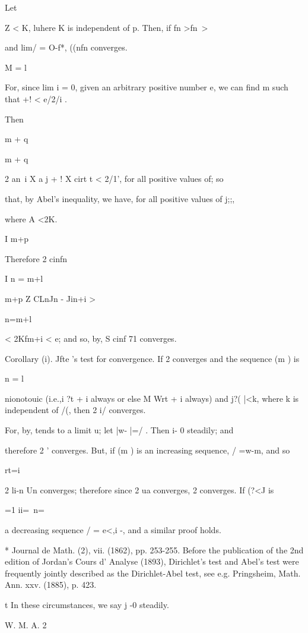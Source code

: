 Let

Z < K, luhere K is independent of p. Then, if fn >fn\-\ >

and lim/ = O-f*, ((nfn converges.

M = l

For, since lim i = 0, given an arbitrary positive number e, we can
find m such that +! < e/2/i .

Then

m + q

m + q

2 an\ i X a j + ! X cirt t < 2/1', for all positive values of; so

that, by Abel's inequality, we have, for all positive values of j;;,

where A <2K.

I m+p

Therefore 2 cinfn

I n = m+l

m+p Z CLnJn - Jin+i >

n=m+l

< 2Kfm+i < e; and so, by, S cinf 71 converges.

Corollary (i). Jfte 's test for convergence. If 2 converges and the
sequence (m ) is

n = l

nionotouic (i.e.,i ?t + i always or else M Wrt + i always) and j?(
|<k, where k is independent of /(, then 2 i/ converges.

For, by, tends to a limit u; let |w- |=/ . Then i- 0 steadily;
and

therefore 2 ' converges. But, if (m ) is an increasing sequence, /
=w-m, and so

rt=i

2 li-n Un converges; therefore since 2 ua converges, 2 converges. If
(?<J is

 =1 ii=\ n=\

a decreasing sequence / = e<,i -, and a similar proof holds.

* Journal de Math. (2), vii. (1862), pp. 253-255. Before the
publication of the 2nd edition of Jordan's Cours d' Analyse (1893),
Dirichlet's test and Abel's test were frequently jointly described as
the Dirichlet-Abel test, see e.g. Pringsheim, Math. Ann. xxv. (1885),
p. 423.

t In these circumstances, we say j -0 steadily.

W. M. A. 2

%
%

